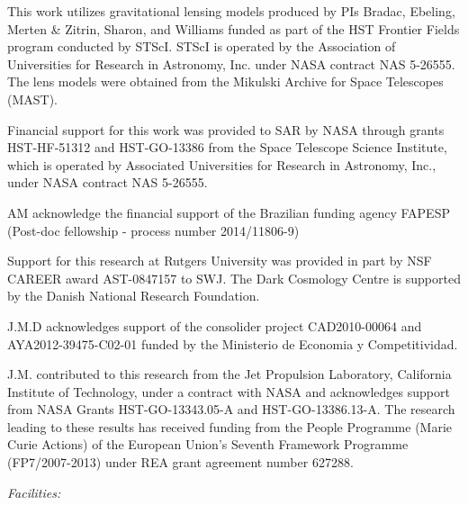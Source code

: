 This work utilizes gravitational lensing models produced by PIs
Bradac, Ebeling, Merten \& Zitrin, Sharon, and Williams funded as part
of the HST Frontier Fields program conducted by STScI. STScI is
operated by the Association of Universities for Research in Astronomy,
Inc. under NASA contract NAS 5-26555. The lens models were obtained
from the Mikulski Archive for Space Telescopes (MAST).

Financial support for this work was provided to SAR by NASA through grants
HST-HF-51312 and HST-GO-13386 from the Space Telescope
Science Institute, which is operated by Associated Universities for
Research in Astronomy, Inc., under NASA contract NAS 5-26555.

AM acknowledge the financial support of the Brazilian funding agency
FAPESP (Post-doc fellowship - process number 2014/11806-9)

Support for this research at Rutgers University was provided in part
by NSF CAREER award AST-0847157 to SWJ.  The Dark Cosmology Centre is
supported by the Danish National Research Foundation.

J.M.D acknowledges support of the consolider project CAD2010-00064 and
AYA2012-39475-C02-01 funded by the Ministerio de Economia y
Competitividad.

J.M. contributed to this research from the Jet Propulsion Laboratory,
California Institute of Technology, under a contract with NASA and
acknowledges support from NASA Grants HST-GO-13343.05-A and
HST-GO-13386.13-A. The research leading to these results has received
funding from the People Programme (Marie Curie Actions) of the European
Union's Seventh Framework Programme (FP7/2007-­2013) under REA grant
agreement number 627288.

{\it Facilities:} 
\smallskip






